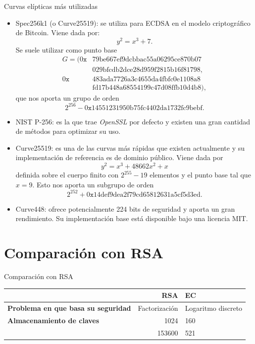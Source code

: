 \documentclass[12pt]{beamer}
\begin{document}
\begin{frame}[fragile, allowframebreaks=0.8]{Curvas elípticas más utilizadas}
  \begin{itemize}
\item Spec256k1 (o Curve25519): se utiliza para ECDSA en el modelo criptográfico de Bitcoin. Viene dada por:
\[
y^2 = x^3 + 7.
\]
Se suele utilizar como punto base
\begin{align*}
G = (0\texttt{x}&\text{79be667ef9dcbbac55a06295ce870b07} \\
				&\text{029bfcdb2dce28d959f2815b16f81798}, \\
	 0\texttt{x}&\text{483ada7726a3c4655da4fbfc0e1108a8} \\
	 			&\text{fd17b448a68554199c47d08ffb10d4b8}),
\end{align*}
que nos aporta un grupo de orden
\[
2^{256}-0\texttt{x}\text{14551231950b75fc4402da1732fc9bebf}.
\]

\item NIST P-256: es la que trae \textit{OpenSSL} por defecto y existen una gran cantidad de métodos para optimizar su uso. \\

\item Curve25519: es una de las curvas más rápidas que existen actualmente y su implementación de referencia es de dominio público. Viene dada por
\[
y^2 = x^3 + 48662x^2 + x
\]
definida sobre el cuerpo finito con $ 2^{255} - 19 $ elementos y el punto base tal que $ x = 9 $. Esto nos aporta un subgrupo de orden 
\[  2^{252 }+ 0\texttt{x}\text{14def9dea2f79cd65812631a5cf5d3ed}. \]

\item  Curve448: ofrece potencialmente 224 bits de seguridad y aporta un gran rendimiento. Su implementación base está disponible bajo una licencia MIT. \\
\end{itemize}

\end{frame}

\section{Comparación con RSA}\label{rsa}
\normalsize
\begin{frame}[fragile]{Comparación con RSA}
  \begin{table}[H]
	  \centering
	  \begin{adjustbox}{width=\textwidth}
	    \begin{tabular}{L{3cm}rR{3cm}}
	  \toprule
	   & \textbf{RSA} & \textbf{EC} \\
	  \midrule
	  \textbf{Problema en que basa su seguridad} & Factorización & Logaritmo discreto\\
	  \textbf{Almacenamiento de claves} & 1024 & 160\\
           & 153600 & 521 \\
	  \bottomrule
	\end{tabular}
	\end{adjustbox}
	\end{table}
\end{frame}
\end{document}
